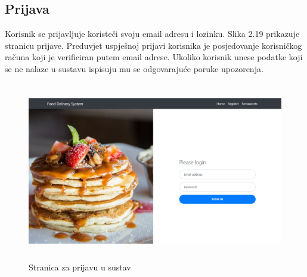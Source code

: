 \documentclass[times, utf8, zavrsni, numeric]{fer}
\begin{document}
\subsection{Prijava}
Korisnik se prijavljuje koristeči svoju email adresu i lozinku. Slika 2.19 prikazuje stranicu prijave. Preduvjet uspješnoj prijavi korisnika je 
posjedovanje korisničkog računa koji je verificiran putem email adrese. Ukoliko korisnik unese podatke koji se ne nalaze u sustavu ispisuju mu se odgovarajuće poruke upozorenja.
\begin{figure}[htb]
\centering
\includegraphics[height=7.8cm]{login.png}
\caption{Stranica za prijavu u sustav}
\label{fig:login}
\end{figure}
\end{document}

